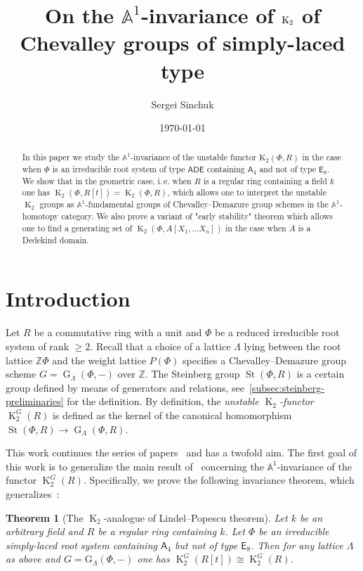 \documentclass[oneside, 10pt]{amsart}
\title{On the $\mathbb{A}^1$-invariance of $\K_2$ of Chevalley groups of simply-laced type}
\author {Sergei Sinchuk}
\date {\today}
\DeclareMathOperator{\St}{St}
\DeclareMathOperator{\G}{G}
\DeclareMathOperator{\K}{K}
\newcommand{\rA}{\mathsf{A}}
\newcommand{\rE}{\mathsf{E}}
\newcommand{\ZZ}{\mathbb{Z}}
\newtheorem{thm}{Theorem}
\numberwithin{equation}{section}
\numberwithin{thm}{section}
\numberwithin{lemma}{section}
\theoremstyle{definition}
\theoremstyle{remark}
\begin{document}
    \maketitle


\begin{abstract}
In this paper we study the $\mathbb{A}^1$-invariance of the unstable functor $\mathrm{K}_2(\Phi, R)$
in the case when $\Phi$ is an irreducible root system of type $\mathsf{ADE}$ containing $\rA_4$ and not of type $\rE_8$.
We show that in the geometric case, i.\,e. when $R$ is a regular ring containing a field $k$
one has $\K_2(\Phi, R[t]) = \K_2(\Phi, R)$, which allows one to interpret the unstable $\K_2$ groups
as $\mathbb{A}^1$-fundamental groups of Chevalley--Demazure group schemes in the $\mathbb{A}^1$-homotopy category.
We also prove a variant of "early stability" theorem which allows one to find a generating set
of $\K_2(\Phi, A[X_1, \ldots X_n])$ in the case when $A$ is a Dedekind domain.
\end{abstract}

\section{Introduction}\label{sec:introduction}

Let $R$ be a commutative ring with a unit and $\Phi$ be a reduced irreducible root system of rank $\geq 2$.
Recall that a choice of a lattice $\Lambda$ lying between the root lattice $\mathbb{Z}\Phi$ and the weight lattice $P(\Phi)$
 specifies a Chevalley--Demazure group scheme $G=\G_\Lambda(\Phi, -)$ over $\ZZ$.
The Steinberg group $\St(\Phi, R)$ is a certain group defined by means of generators and relations, see~\cref{subsec:steinberg-preliminaries} for the definition.
By definition, the \textit{unstable $\K_2$-functor} $\K_2^G(R)$ is defined as the kernel of the canonical homomorphism $\St(\Phi, R) \to \G_\Lambda(\Phi, R)$.

This work continues the series of papers~\cite{LS20, LSV2} and has a twofold aim.
The first goal of this work is to generalize the main result of~\cite{LSV2} concerning the $\mathbb{A}^1$-invariance of the functor $\K_2^G(R)$.
Specifically, we prove the following invariance theorem, which generalizes~\cite[Theorem~1.1]{LSV2}:

\begin{thm}[The $\K_2$-analogue of Lindel--Popescu theorem] \label{thm:LP-for-K2}
 Let $k$ be an arbitrary field and $R$ be a regular ring containing $k$.
 Let $\Phi$ be an irreducible simply-laced root system containing $\rA_4$ but not of type $\rE_8$.
 Then for any lattice $\Lambda$ as above and $G = \mathrm{G}_\Lambda(\Phi, -)$ one has
 $\K_2^G(R[t])\cong\K_2^G(R).$
\end{thm}
\end{document}
